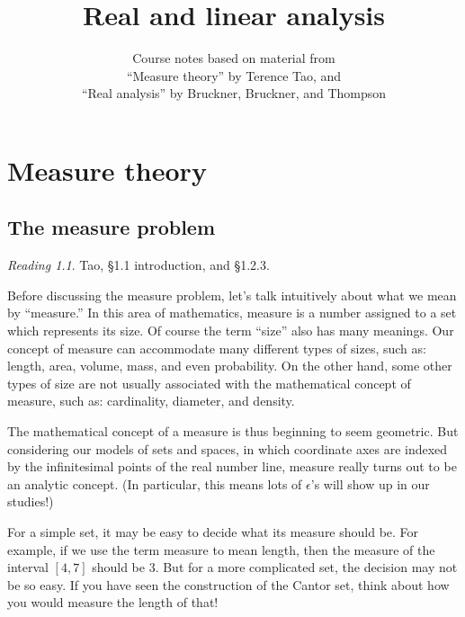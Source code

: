 \documentclass[11pt,oneside]{amsbook}
\title{Real and linear analysis}
\author{Course notes based on material from\\``Measure theory'' by Terence Tao, and\\``Real analysis'' by Bruckner, Bruckner, and Thompson}
\theoremstyle{definition}
\theoremstyle{plain}
\theoremstyle{definition}
\theoremstyle{remark}
\newtheorem*{reading}{Reading}
\numberwithin{equation}{section}
\numberwithin{figure}{section}
\begin{document}
\maketitle

\tableofcontents

\chapter{Measure theory}

\section{The measure problem}

\begin{reading}
  Tao, \S1.1 introduction, and \S1.2.3.
\end{reading}

Before discussing the measure problem, let's talk intuitively about what we mean by ``measure.'' In this area of mathematics, measure is a number assigned to a set which represents its size. Of course the term ``size'' also has many meanings. Our concept of measure can accommodate many different types of sizes, such as: length, area, volume, mass, and even probability. On the other hand, some other types of size are not usually associated with the mathematical concept of measure, such as: cardinality, diameter, and density.

The mathematical concept of a measure is thus beginning to seem geometric. But considering our models of sets and spaces, in which coordinate axes are indexed by the infinitesimal points of the real number line, measure really turns out to be an analytic concept. (In particular, this means lots of $\epsilon$'s will show up in our studies!)

For a simple set, it may be easy to decide what its measure should be. For example, if we use the term measure to mean length, then the measure of the interval $[4,7]$ should be $3$. But for a more complicated set, the decision may not be so easy. If you have seen the construction of the Cantor set, think about how you would measure the length of that!
\end{document}
